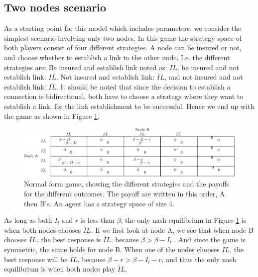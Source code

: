 \subsection{Two nodes scenario}
As a starting point for this model which includes parameters, we consider the simplest scenario involving only two nodes. In this game the strategy space of both players consist of four different strategies. A node can be insured or not, and choose whether to establish a link to the other node. I.e. the different strategies are: Be insured and establish link noted as: $IL$, 
be insured and not establish link: $I\overline{L}$. Not insured and establish link: $\overline{I}L$, and not insured and not establish link: $\overline{IL}$. It should be noted that since the decision to establish a connection is bidirectional, both have to choose a strategy where they want to establish a link, for the link establishment to be successful. Hence we end up with the game as shown in Figure \ref{fig:FirstGameTheoryModel}.

\begin{figure} 
\centering
\includegraphics[width=1.0\textwidth]{../Figures/FirstGameWithParameters.png}
\caption{\label{fig:FirstGameTheoryModel} Normal form game, showing the different strategies and the payoffs  for the different outcomes. The payoff are written in this order, A then B's. An agent has a strategy space of size 4.}
\end{figure}

As long as both $I_{l} \text{ and } r$ is less than $\beta$, the only nash equilibrium in Figure \ref{fig:FirstGameTheoryModel} is when both nodes chooses $\overline{I}L$. If we first look at node A, we see that when node B chooses $IL$, the best response is $\overline{I}L$, because $ \beta >\beta- I_{l}$ . And since the game is symmetric, the same holds for node B. 
When one of the nodes chooses $\overline{I}L$, the best response will be $\overline{I}L$, because $\beta - r>\beta - I_{l} - r  $, and thus the only nash equilibrium is when both nodes play $\overline{I}L$.

